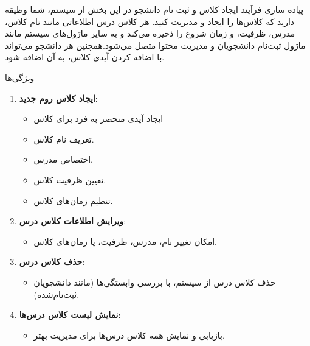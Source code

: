 

{پیاده سازی فرآیند ایجاد کلاس و ثبت نام دانشجو}
در این بخش از سیستم، شما وظیقه دارید که کلاس‌ها را ایجاد و مدیریت کنید. هر کلاس درس اطلاعاتی مانند نام کلاس، مدرس، ظرفیت، و زمان شروع را ذخیره می‌کند و به سایر ماژول‌های سیستم مانند ماژول ثبت‌نام دانشجویان و مدیریت محتوا متصل می‌شود.همچنین هر دانشجو می‌تواند با اضافه کردن آیدی کلاس، به آن اضافه شود.

{ویژگی‌ها}
\begin{enumerate}
    \item \textbf{ایجاد کلاس روم جدید}:
    \begin{itemize}
        \item ایجاد آیدی منحصر به فرد برای کلاس
        \item تعریف نام کلاس.
        \item اختصاص مدرس.
        \item تعیین ظرفیت کلاس.
        \item تنظیم زمان‌های کلاس.
    \end{itemize}
    \item \textbf{ویرایش اطلاعات کلاس درس}:
    \begin{itemize}
        \item امکان تغییر نام، مدرس، ظرفیت، یا زمان‌های کلاس.
    \end{itemize}
    \item \textbf{حذف کلاس درس}:
    \begin{itemize}
        \item حذف کلاس درس از سیستم، با بررسی وابستگی‌ها (مانند دانشجویان ثبت‌نام‌شده).
    \end{itemize}
    \item \textbf{نمایش لیست کلاس درس‌ها}:
    \begin{itemize}
        \item بازیابی و نمایش همه کلاس درس‌ها برای مدیریت بهتر.
    \end{itemize}
\end{enumerate}
